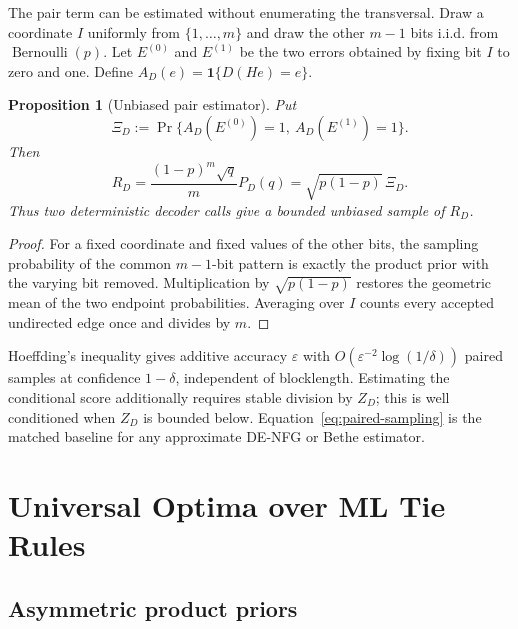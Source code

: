 \documentclass[journal]{IEEEtran}
\newtheorem{proposition}[theorem]{Proposition}
\theoremstyle{definition}
\theoremstyle{remark}
\newcommand{\ind}{\mathbf 1}
\begin{document}
The pair term can be estimated without enumerating the transversal.  Draw a
coordinate $I$ uniformly from $\{1,\ldots,m\}$ and draw the other $m-1$ bits
i.i.d. from $\operatorname{Bernoulli}(p)$.  Let $E^{(0)}$ and $E^{(1)}$ be the
two errors obtained by fixing bit $I$ to zero and one.  Define
$A_D(e)=\ind\{D(He)=e\}$.

\begin{proposition}[Unbiased pair estimator]
\label{prop:paired-sampling}
Put
\begin{equation}
 \Xi_D:=\Pr\{A_D(E^{(0)})=1,\ A_D(E^{(1)})=1\}.
 \label{eq:paired-event}
\end{equation}
Then
\begin{equation}
 R_D=\frac{(1-p)^m\sqrt q}{m}P_D(q)
     =\sqrt{p(1-p)}\,\Xi_D.
 \label{eq:paired-sampling}
\end{equation}
Thus two deterministic decoder calls give a bounded unbiased sample of
$R_D$.
\end{proposition}

\begin{proof}
For a fixed coordinate and fixed values of the other bits, the sampling
probability of the common $m-1$-bit pattern is exactly the product prior with
the varying bit removed.  Multiplication by $\sqrt{p(1-p)}$ restores the
geometric mean of the two endpoint probabilities.  Averaging over $I$ counts
every accepted undirected edge once and divides by $m$.
\end{proof}

Hoeffding's inequality gives additive accuracy $\varepsilon$ with
$O(\varepsilon^{-2}\log(1/\delta))$ paired samples at confidence $1-\delta$,
independent of blocklength.  Estimating the conditional score additionally
requires stable division by $Z_D$; this is well conditioned when $Z_D$ is
bounded below.  Equation~\eqref{eq:paired-sampling} is the matched baseline
for any approximate DE-NFG or Bethe estimator.

\section{Universal Optima over ML Tie Rules}
\label{sec:universal-ml}

\subsection{Asymmetric product priors}
\end{document}
